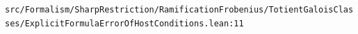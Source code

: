 \nolinkurl{src/Formalism/SharpRestriction/RamificationFrobenius/TotientGaloisClasses/ExplicitFormulaErrorOfHostConditions.lean:11}%
